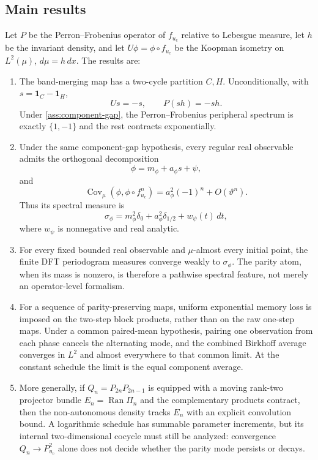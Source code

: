 \documentclass[11pt]{article}
\theoremstyle{definition}
\theoremstyle{remark}
\newcommand{\uc}{u_{\mathrm c}}
\newcommand{\one}{\mathbf 1}
\newcommand{\Cov}{\operatorname{Cov}}
\begin{document}
\subsection*{Main results}

Let $P$ be the Perron--Frobenius operator of $f_{\uc}$ relative to Lebesgue measure, let $h$ be the invariant density, and let $U\phi=\phi\circ f_{\uc}$ be the Koopman isometry on $L^2(\mu)$, $d\mu=h\,dx$.  The results are:

\begin{enumerate}[label=\textbf{R\arabic*.},leftmargin=3.2em]
    \item The band-merging map has a two-cycle partition $C,H$.  Unconditionally, with $s=\one_C-\one_H$,
    \[
        Us=-s,
        \qquad P(sh)=-sh.
    \]
    Under \cref{ass:component-gap}, the Perron--Frobenius peripheral spectrum is exactly $\{1,-1\}$ and the rest contracts exponentially.

    \item Under the same component-gap hypothesis, every regular real observable admits the orthogonal decomposition
    \[
        \phi=m_\phi+a_\phi s+\psi,
    \]
    and
    \[
        \Cov_\mu(\phi,\phi\circ f_{\uc}^n)
        =a_\phi^2(-1)^n+O(\vartheta^n).
    \]
    Thus its spectral measure is
    \[
        \sigma_\phi
        =m_\phi^2\delta_0+a_\phi^2\delta_{1/2}
         +w_\psi(t)\,dt,
    \]
    where $w_\psi$ is nonnegative and real analytic.

    \item For every fixed bounded real observable and $\mu$-almost every initial point, the finite DFT periodogram measures converge weakly to $\sigma_\phi$.  The parity atom, when its mass is nonzero, is therefore a pathwise spectral feature, not merely an operator-level formalism.

    \item For a sequence of parity-preserving maps, uniform exponential memory loss is imposed on the two-step block products, rather than on the raw one-step maps.  Under a common paired-mean hypothesis, pairing one observation from each phase cancels the alternating mode, and the combined Birkhoff average converges in $L^2$ and almost everywhere to that common limit.  At the constant schedule the limit is the equal component average.

    \item More generally, if $Q_n=P_{2n}P_{2n-1}$ is equipped with a moving rank-two projector bundle $E_n=\operatorname{Ran}\Pi_n$ and the complementary products contract, then the non-autonomous density tracks $E_n$ with an explicit convolution bound.  A logarithmic schedule has summable parameter increments, but its internal two-dimensional cocycle must still be analyzed: convergence $Q_n\to P_{\uc}^2$ alone does not decide whether the parity mode persists or decays.
\end{enumerate}
\end{document}
